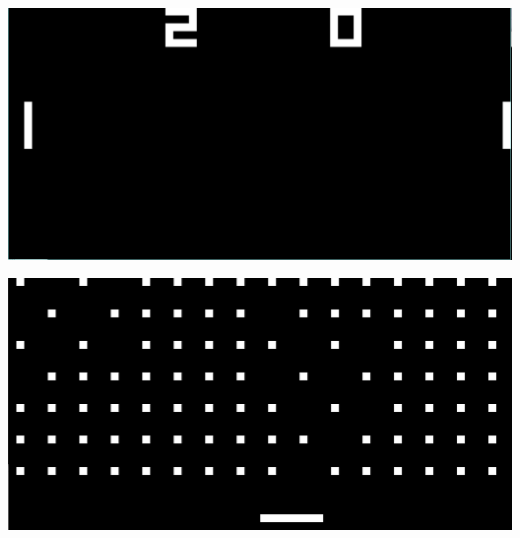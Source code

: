 \documentclass[12pt, a4paper]{article}
\begin{document}
\bigskip
\bigskip

\includegraphics[width=14cm]{chip8cap5.PNG}

\bigskip
\bigskip

\includegraphics[width=14cm]{chip8cap6.PNG}
\end{document}
